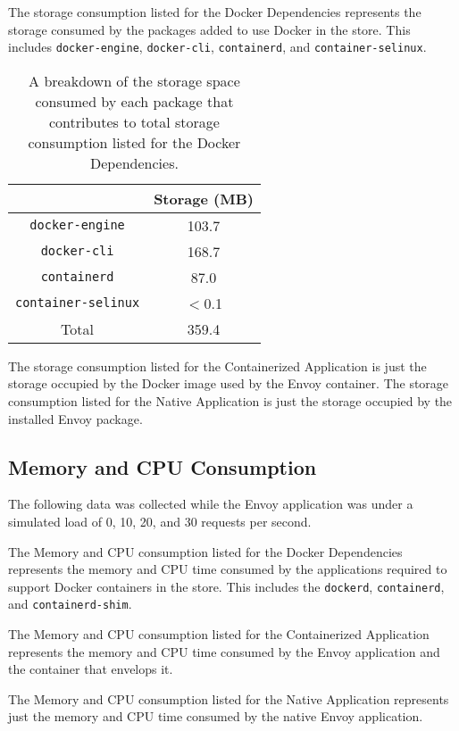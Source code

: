\documentclass{article}
\begin{document}
The storage consumption listed for the Docker Dependencies represents the storage consumed by the packages added to use Docker in the store. This includes \texttt{docker-engine}, \texttt{docker-cli}, \texttt{containerd}, and \texttt{container-selinux}.

\begin{table}[H]
\begin{tabular}{ |c|c| }
 \hline
   & Storage (MB) \\ 
 \hline
 \texttt{docker-engine} & 103.7 \\
 \hline
 \texttt{docker-cli} & 168.7 \\
 \hline
 \texttt{containerd} & 87.0 \\
 \hline
 \texttt{container-selinux} & $<$0.1 \\
 \hline\hline
 Total & 359.4 \\
 \hline
\end{tabular}
\caption{A breakdown of the storage space consumed by each package that contributes to total storage consumption listed for the Docker Dependencies.}
\label{storage-breakdown}
\end{table}

The storage consumption listed for the Containerized Application is just the storage occupied by the Docker image used by the Envoy container. The storage consumption listed for the Native Application is just the storage occupied by the installed Envoy package.

\subsection{Memory and CPU Consumption}
The following data was collected while the Envoy application was under a simulated load of 0, 10, 20, and 30 requests per second.

The Memory and CPU consumption listed for the Docker Dependencies represents the memory and CPU time consumed by the applications required to support Docker containers in the store. This includes the \texttt{dockerd}, \texttt{containerd}, and \texttt{containerd-shim}.

The Memory and CPU consumption listed for the Containerized Application represents the memory and CPU time consumed by the Envoy application and the container that envelops it.

The Memory and CPU consumption listed for the Native Application represents just the memory and CPU time consumed by the native Envoy application.
\end{document}
